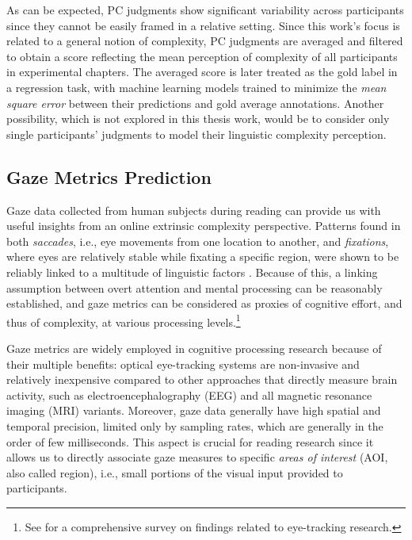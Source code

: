 \documentclass[a4paper, nobind]{templates/ociamthesis}
\begin{document}
As can be expected, PC judgments show significant variability across participants since they cannot be easily framed in a relative setting. Since this work's focus is related to a general notion of complexity, PC judgments are averaged and filtered to obtain a score reflecting the mean perception of complexity of all participants in experimental chapters. The averaged score is later treated as the gold label in a regression task, with machine learning models trained to minimize the \emph{mean square error} between their predictions and gold average annotations. Another possibility, which is not explored in this thesis work, would be to consider only single participants' judgments to model their linguistic complexity perception.

\hypertarget{subsubchap:eye-tracking}{%
\subsection{Gaze Metrics Prediction}\label{subsubchap:eye-tracking}}

Gaze data collected from human subjects during reading can provide us with useful insights from an online extrinsic complexity perspective. Patterns found in both \emph{saccades}, i.e., eye movements from one location to another, and \emph{fixations}, where eyes are relatively stable while fixating a specific region, were shown to be reliably linked to a multitude of linguistic factors \autocite{demberg-keller-2008-data}. Because of this, a linking assumption between overt attention and mental processing can be reasonably established, and gaze metrics can be considered as proxies of cognitive effort, and thus of complexity, at various processing levels.\footnote{See \textcite{rayner-1998-eye} for a comprehensive survey on findings related to eye-tracking research.}

Gaze metrics are widely employed in cognitive processing research because of their multiple benefits: optical eye-tracking systems are non-invasive and relatively inexpensive compared to other approaches that directly measure brain activity, such as electroencephalography (EEG) and all magnetic resonance imaging (MRI) variants. Moreover, gaze data generally have high spatial and temporal precision, limited only by sampling rates, which are generally in the order of few milliseconds. This aspect is crucial for reading research since it allows us to directly associate gaze measures to specific \emph{areas of interest} (AOI, also called region), i.e., small portions of the visual input provided to participants.
\end{document}
